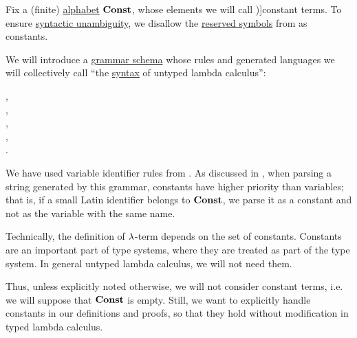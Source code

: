 \begin{definition}\label{def:lambda_term}\mimprovised
  Fix a (finite) \hyperref[def:formal_language/alphabet]{alphabet} \( \op*{Const} \), whose elements we will call \term[en=constant (\cite[202]{Andrews2002Logic})]{constant terms}. To ensure \hyperref[def:grammar_ambiguity]{syntactic unambiguity}, we disallow the \hyperref[con:reserved_symbol]{reserved symbols} from  as constants.

  We will introduce a \hyperref[def:formal_grammar/schema]{grammar schema} whose rules and generated languages we will collectively call \enquote{the \hyperref[con:syntax_semantics_duality]{syntax} of untyped lambda calculus}:
  \begin{bnf*}
        {}, \\
            { \bnfor {}}, \\
     {\bnftsq{\( ( \)} \bnfsp {} \bnfsp {} \bnfsp \bnftsq{\( ) \)}}, \\
     {\bnftsq{\( ( \)} \bnfsp \bnftsq{\( \synlambda \)} \bnfsp {} \bnfsp {} \bnfsp {} \bnfsp \bnftsq{\( ) \)}}, \\
            { \bnfor {} \bnfor {}}.
  \end{bnf*}

  We have used variable identifier rules from . As discussed in , when parsing a string generated by this grammar, constants have higher priority than variables; that is, if a small Latin identifier belongs to \( \op*{Const} \), we parse it as a constant and not as the variable with the same name.

  \begin{thmenum}
     Technically, the definition of \( {\mathrm \lambda} \)-term depends on the set of constants. Constants are an important part of type systems, where they are treated as part of the type system. In general untyped lambda calculus, we will not need them.

    Thus, unless explicitly noted otherwise, we will not consider constant terms, i.e. we will suppose that \( \op*{Const} \) is empty. Still, we want to explicitly handle constants in our definitions and proofs, so that they hold without modification in typed lambda calculus.


\end{thmenum}
\end{definition}
